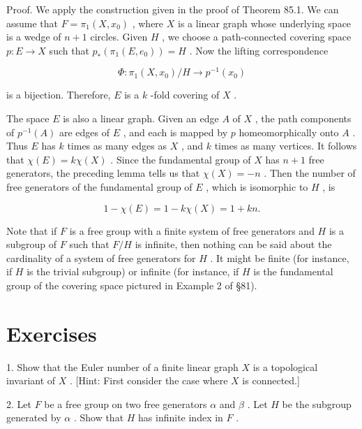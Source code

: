 \documentclass[10pt]{article}
\begin{document}
Proof. We apply the construction given in the proof of Theorem 85.1. We can assume that \(F = {\pi }_{1}\left( {X,{x}_{0}}\right)\) , where \(X\) is a linear graph whose underlying space is a wedge of \(n + 1\) circles. Given \(H\) , we choose a path-connected covering space \(p : E \rightarrow  X\) such that \({p}_{ * }\left( {{\pi }_{1}\left( {E,{e}_{0}}\right) }\right)  = H\) . Now the lifting correspondence

\[
\Phi  : {\pi }_{1}\left( {X,{x}_{0}}\right) /H \rightarrow  {p}^{-1}\left( {x}_{0}\right)
\]

is a bijection. Therefore, \(E\) is a \(k\) -fold covering of \(X\) .

The space \(E\) is also a linear graph. Given an edge \(A\) of \(X\) , the path components of \({p}^{-1}\left( A\right)\) are edges of \(E\) , and each is mapped by \(p\) homeomorphically onto \(A\) . Thus \(E\) has \(k\) times as many edges as \(X\) , and \(k\) times as many vertices. It follows that \(\chi \left( E\right)  = {k\chi }\left( X\right)\) . Since the fundamental group of \(X\) has \(n + 1\) free generators, the preceding lemma tells us that \(\chi \left( X\right)  =  - n\) . Then the number of free generators of the fundamental group of \(E\) , which is isomorphic to \(H\) , is

\[
1 - \chi \left( E\right)  = 1 - {k\chi }\left( X\right)  = 1 + {kn}.
\]

Note that if \(F\) is a free group with a finite system of free generators and \(H\) is a subgroup of \(F\) such that \(F/H\) is infinite, then nothing can be said about the cardinality of a system of free generators for \(H\) . It might be finite (for instance, if \(H\) is the trivial subgroup) or infinite (for instance, if \(H\) is the fundamental group of the covering space pictured in Example 2 of §81).

\section*{Exercises}

1. Show that the Euler number of a finite linear graph \(X\) is a topological invariant of \(X\) . [Hint: First consider the case where \(X\) is connected.]

2. Let \(F\) be a free group on two free generators \(\alpha\) and \(\beta\) . Let \(H\) be the subgroup generated by \(\alpha\) . Show that \(H\) has infinite index in \(F\) .
\end{document}
